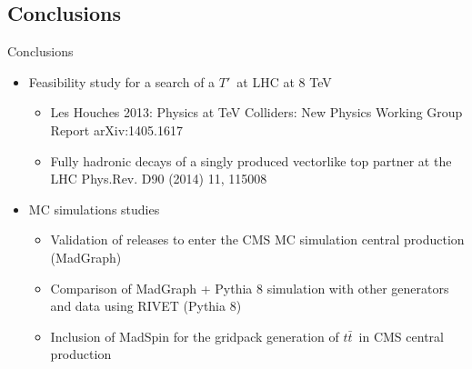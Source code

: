 \documentclass[usenames,dvipsnames]{beamer}
\newcommand{\ttbar}{$t\bar{t}$}
\newcommand{\Tp}{$T'$}
\begin{document}
\subsection{Conclusions}
\begin{frame}{Conclusions}
\vspace{-.5cm}
\begin{block}{}\scriptsize
\begin{itemize}
  \item Feasibility study for a search of a \Tp~at LHC at 8 TeV
    \begin{itemize}\scriptsize
      \item Les Houches 2013: Physics at TeV Colliders: New Physics Working Group Report arXiv:1405.1617
      \item Fully hadronic decays of a singly produced vectorlike top partner at the LHC Phys.Rev. D90 (2014) 11, 115008
    \end{itemize}
  \item MC simulations studies
    \begin{itemize}\scriptsize
          \item Validation of releases to enter the CMS MC simulation central production (MadGraph)
          \item Comparison of MadGraph + Pythia 8 simulation with other generators and data using RIVET (Pythia 8)
          \item Inclusion of MadSpin for the gridpack generation of \ttbar~in CMS central production

\end{itemize}
\end{itemize}
\end{block}
\end{frame}
\end{document}

